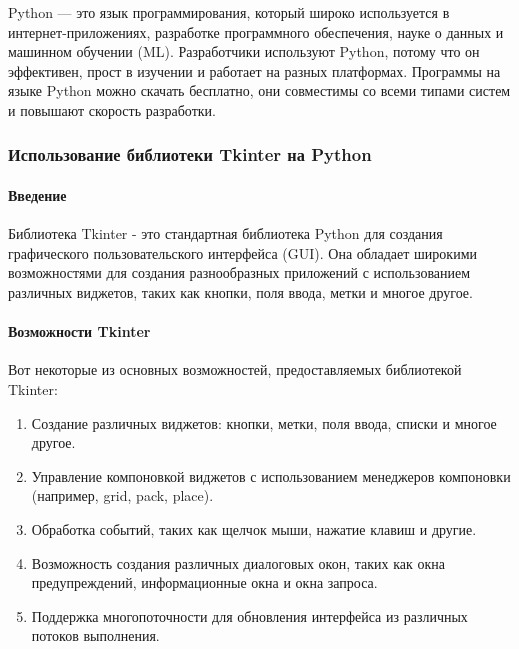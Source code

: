 Python — это язык программирования, который широко используется в интернет-приложениях, разработке программного обеспечения, науке о данных и машинном обучении (ML). Разработчики используют Python, потому что он эффективен, прост в изучении и работает на разных платформах. Программы на языке Python можно скачать бесплатно, они совместимы со всеми типами систем и повышают скорость разработки.

\subsubsection{Использование библиотеки Tkinter на Python}
	
\paragraph{Введение}
Библиотека Tkinter - это стандартная библиотека Python для создания графического пользовательского интерфейса (GUI). Она обладает широкими возможностями для создания разнообразных приложений с использованием различных виджетов, таких как кнопки, поля ввода, метки и многое другое.
	
\paragraph{Возможности Tkinter}
Вот некоторые из основных возможностей, предоставляемых библиотекой Tkinter:
	
\begin{enumerate}
	\item Создание различных виджетов: кнопки, метки, поля ввода, списки и многое другое.
	\item Управление компоновкой виджетов с использованием менеджеров компоновки (например, grid, pack, place).
	\item Обработка событий, таких как щелчок мыши, нажатие клавиш и другие.
	\item Возможность создания различных диалоговых окон, таких как окна предупреждений, информационные окна и окна запроса.
	\item Поддержка многопоточности для обновления интерфейса из различных потоков выполнения.
\end{enumerate}

